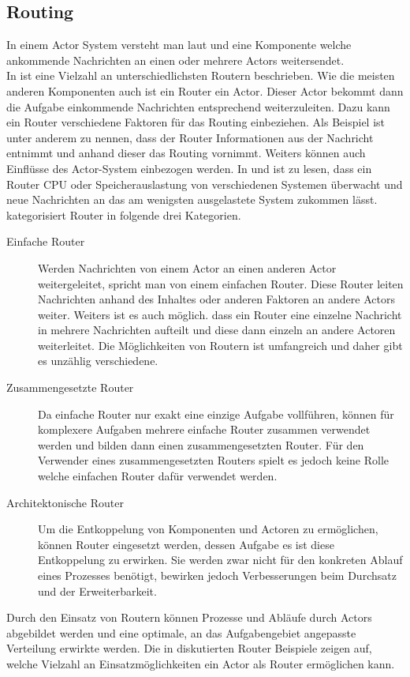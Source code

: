 \subsection{Routing}\label{sec:actor:patterns:routing}
In einem Actor System versteht man laut \cite{Vernon2015ReactiveAkka} und \cite{kuhn2017reactive} eine Komponente welche ankommende Nachrichten an einen oder mehrere Actors weitersendet. \\
In \cite{Vernon2015ReactiveAkka} ist eine Vielzahl an unterschiedlichsten Routern beschrieben. Wie die meisten anderen Komponenten auch ist ein Router ein Actor. Dieser Actor bekommt dann die Aufgabe einkommende Nachrichten entsprechend weiterzuleiten. Dazu kann ein Router verschiedene Faktoren für das Routing einbeziehen. Als Beispiel ist unter anderem zu nennen, dass der Router Informationen aus der Nachricht entnimmt und anhand dieser das Routing vornimmt. Weiters können auch Einflüsse des Actor-System einbezogen werden. In \cite{Vernon2015ReactiveAkka} und \cite{Akka.netCommunityAkka.NETDocumentation} ist zu lesen, dass ein Router CPU oder Speicherauslastung von verschiedenen Systemen überwacht und neue Nachrichten an das am wenigsten ausgelastete System zukommen lässt. \\
\cite{Vernon2015ReactiveAkka} kategorisiert Router in folgende drei Kategorien. 
\begin{description}
  \item[Einfache Router] Werden Nachrichten von einem Actor an einen anderen Actor weitergeleitet, spricht man von einem einfachen Router. Diese Router leiten Nachrichten anhand des Inhaltes oder anderen Faktoren an andere Actors weiter. Weiters ist es auch möglich. dass ein Router eine einzelne Nachricht in mehrere Nachrichten aufteilt und diese dann einzeln an andere Actoren weiterleitet. Die Möglichkeiten von Routern ist umfangreich und daher gibt es unzählig verschiedene.
  \item[Zusammengesetzte Router] Da einfache Router nur exakt eine einzige Aufgabe vollführen, können für komplexere Aufgaben mehrere einfache Router zusammen verwendet werden und bilden dann einen zusammengesetzten Router. Für den Verwender eines zusammengesetzten Routers spielt es jedoch keine Rolle welche einfachen Router dafür verwendet werden.
  \item[Architektonische Router] Um die Entkoppelung von Komponenten und Actoren zu ermöglichen, können Router eingesetzt werden, dessen Aufgabe es ist diese Entkoppelung zu erwirken. Sie werden zwar nicht für den konkreten Ablauf eines Prozesses benötigt, bewirken jedoch Verbesserungen beim Durchsatz und der Erweiterbarkeit. 
\end{description}
Durch den Einsatz von Routern können Prozesse und Abläufe durch Actors abgebildet werden und eine optimale, an das Aufgabengebiet angepasste Verteilung erwirkte werden. Die in \cite{Vernon2015ReactiveAkka} diskutierten Router Beispiele zeigen auf, welche Vielzahl an Einsatzmöglichkeiten ein Actor als Router ermöglichen kann. 

